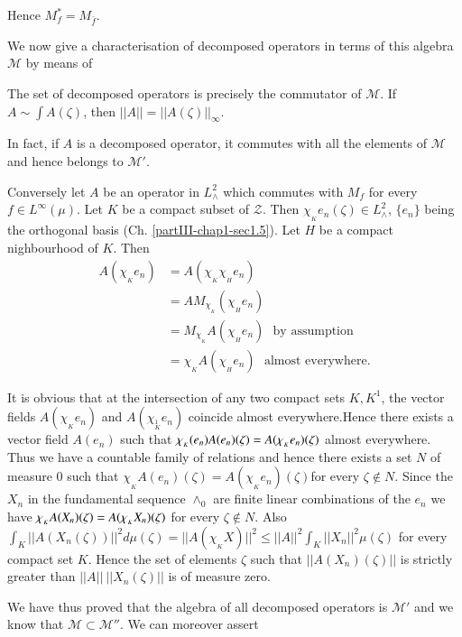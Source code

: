 Hence $M^*_f=M_{\bar{f}}$.
 
We now give a characterisation of decomposed operators in terms of this
algebra $\mathscr{M}$ by means of 

\begin{thm}\label{partIII-chap1-thm2}
The set of decomposed operators is precisely the commutator of
$\mathscr{M}$. If
$A \sim \int A (\zeta)$, then $|| A || = ||
A(\zeta)||_{\infty}$. 
\end{thm}

In fact, if $A$ is a decomposed operator, it commutes with all
the elements of $\mathscr{M}$ and hence belongs to $\mathscr{M}'$.

Conversely let $A$ be an operator in $L^{2}_{\wedge}$ which commutes
with $M_f$ for every $f \in L^\infty(\mu)$. Let $K$ be a compact subset
of $\mathcal{Z}$. Then $\chi_{_K}e_n(\zeta) \in L^{2}_{\wedge}$, $\{e_n\}$
being the orthogonal basis (Ch. \ref{partIII-chap1-sec1.5}). Let $H$ be a compact
nighbourhood of $K$. Then 
\begin{align*}
A(\chi_{_K}e_n) & = A (\chi_{_K}\chi_{_H}e_n)\\ 
& = AM_{\chi_{_K}}(\chi_{_H}e_n)\\ 
& = M_{\chi_{_K}}A(\chi_{_H}e_n) \text{~ by assumption}\\ 
& =\chi_{_K}A(\chi_{_H}e_n) \text{~ almost everywhere}. 
\end{align*}

It is obvious that at the intersection of any two compact sets $K,K^1$,
the vector fields $A (\chi_{_K} e_n)$ and $A (\chi_{_K^1} e_n)$ coincide
almost everywhere.\break Hence there exists a vector field $A(e_n)$ such
that $\chi_{_K}(e_n) A (e_n)(\zeta) =\break A(\chi_{_K}e_n)(\zeta)$ almost
everywhere. Thus we have a countable family of relations and hence
there exists a set $N$ of measure $0$ such that
$\chi_{_K}A(e_n)(\zeta)= A(\chi_{_K}e_n)(\zeta)$\pageoriginale for every
$\zeta \notin N$. Since the $X_n$ in the fundamental sequence $\wedge_0$ are finite
linear combinations of the $e_n$ we have $\chi_{_K}A(X_n)(\zeta)= A
(\chi_{_K}\break X_n)(\zeta)$ for every $\zeta\notin N$. Also $\int_{K} || A
(X_n(\zeta))||^2 d\mu(\zeta)=|| A(\chi_{_K}X)||^2 \le ||A||^2 \int_K ||
X_n ||^2\mu(\zeta)$ for every compact set $K$. Hence the set of
elements $\zeta$ such that $|| A(X_n)(\zeta)||$ is strictly greater
than $||A||~|| X_n(\zeta)||$ is of measure zero. 

We have thus proved that the algebra of all decomposed operators 
is $\mathscr{M}'$ and we know that
$\mathscr{M} \subset \mathscr{M}''$. We can moreover assert 

